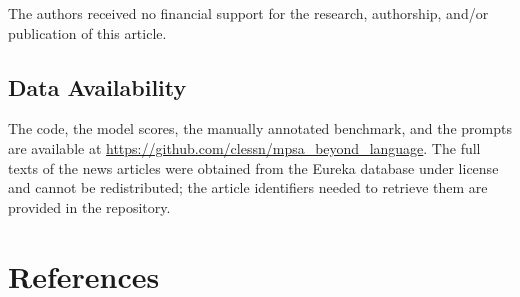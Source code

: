 \documentclass[
  man,
  floatsintext,
  longtable,
  nolmodern,
  notxfonts,
  notimes,
  colorlinks=true,linkcolor=blue,citecolor=blue,urlcolor=blue]{apa7}
\begin{document}
The authors received no financial support for the research, authorship,
and/or publication of this article.

\subsection*{Data Availability}\label{data-availability}

The code, the model scores, the manually annotated benchmark, and the
prompts are available at
\url{https://github.com/clessn/mpsa_beyond_language}. The full texts of
the news articles were obtained from the Eureka database under license
and cannot be redistributed; the article identifiers needed to retrieve
them are provided in the repository.

\section*{References}\label{references}
\end{document}
